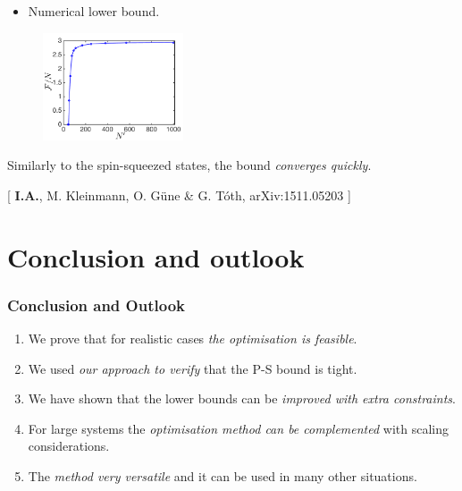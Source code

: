 \documentclass{beamer}
\newcommand{\citate}[1]{{\footnotesize{\color{gray}[ #1 ]}}

	}
\begin{document}
		\begin{frame}
			\begin{itemize}
				\item Numerical lower bound.
			\end{itemize}
			\vspace{-10px}
			\begin{figure}
				\includegraphics[height=120px]{img/asymptoticapproach-dicke.pdf}
			\end{figure}
			Similarly to the spin-squeezed states, the bound \emph{\color{blue}converges quickly}.

			\citate{\textbf{I.A.}, M. Kleinmann, O. G\"une \& G. T\'oth, arXiv:1511.05203}
		\end{frame}

\section{Conclusion and outlook}

	\begin{frame}
		\frametitle{Conclusion and Outlook}
		\begin{enumerate}
			\item<1-> We prove that for realistic cases \emph{\color{blue}the optimisation is feasible}.
			\vspace{5px}
			\item<2-> We used \emph{\color{blue}our approach to verify} that the P-S bound is tight.
			\vspace{5px}
			\item<3-> We have shown that the lower bounds can be \emph{\color{blue}improved with extra constraints}.
			\vspace{5px}
			\item<4-> For large systems the \emph{\color{blue}optimisation method can be complemented} with scaling considerations.
			\vspace{5px}
			\item<5-> The \emph{\color{blue}method very versatile} and it can be used in many other situations.
		\end{enumerate}

	\end{frame}
\end{document}
